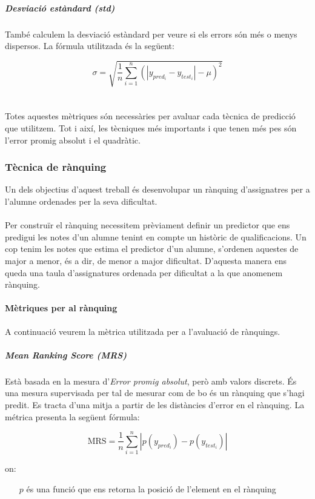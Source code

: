 \documentclass[12pt,a4paper,catalan]{article}
\begin{document}
\subparagraph{Desviació estàndard (std)}
També calculem la desviació estàndard per veure si els errors són més o menys dispersos. La fórmula utilitzada és la següent:

$$ \sigma = \sqrt{ \frac{1}{n} \sum_{i=1}^n (\left| y_{pred_i}-y_{test_i}\right| - \mu)^2 } $$
\\
\\
Totes aquestes mètriques són necessàries per avaluar cada tècnica de predicció que utilitzem. Tot i així, les tècniques més importants i que tenen més pes són l'error promig absolut i el quadràtic.

\subsubsection{Tècnica de rànquing}
Un dels objectius d'aquest treball és desenvolupar un rànquing d'assignatres per a l'alumne ordenades per la seva dificultat. 
\\
\\
Per construïr el rànquing necessitem prèviament definir un predictor que ens predigui les notes d'un alumne tenint en compte un històric de qualificacions. Un cop tenim les notes que estima el predictor d'un alumne, s'ordenen aquestes de major a menor, és a dir, de menor a major dificultat. D'aquesta manera ens queda una taula d'assignatures ordenada per dificultat a la que anomenem rànquing.

\paragraph{Mètriques per al rànquing}
A continuació veurem la mètrica utilitzada per a l'avaluació de rànquings.

\subparagraph{\textit{Mean Ranking Score (MRS)}}
\label{subpar:mrs}
Està basada en la mesura d'\textit{Error promig absolut}, però amb valors discrets. És una mesura supervisada per tal de mesurar com de bo és un rànquing que s'hagi predit. Es tracta d'una mitja a partir de les distàncies d'error en el rànquing. La métrica presenta la següent fórmula:

$$ \mathrm{MRS} = \frac{1}{n}\sum_{i=1}^n \left| p(y_{pred_i}) -  p(y_{test_i})\right| $$

on:
\begin{itemize}[leftmargin=.5in]
	\item [$p$] és una funció que ens retorna la posició de l'element en el rànquing
\end{itemize}
\end{document}
